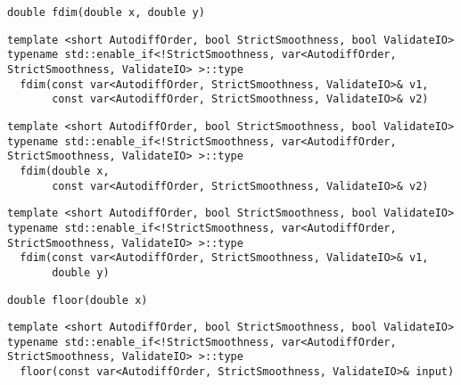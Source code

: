 \begin{tcolorbox}[colback=white,colframe=gray90, coltitle=black,boxrule=3pt,
fonttitle=\bfseries,title= Fdim]

\begin{verbatim}
double fdim(double x, double y)

\end{verbatim}

\begin{verbatim}
template <short AutodiffOrder, bool StrictSmoothness, bool ValidateIO>
typename std::enable_if<!StrictSmoothness, var<AutodiffOrder, StrictSmoothness, ValidateIO> >::type
  fdim(const var<AutodiffOrder, StrictSmoothness, ValidateIO>& v1,
       const var<AutodiffOrder, StrictSmoothness, ValidateIO>& v2)

\end{verbatim}

\begin{verbatim}
template <short AutodiffOrder, bool StrictSmoothness, bool ValidateIO>
typename std::enable_if<!StrictSmoothness, var<AutodiffOrder, StrictSmoothness, ValidateIO> >::type
  fdim(double x,
       const var<AutodiffOrder, StrictSmoothness, ValidateIO>& v2)

\end{verbatim}

\begin{verbatim}
template <short AutodiffOrder, bool StrictSmoothness, bool ValidateIO>
typename std::enable_if<!StrictSmoothness, var<AutodiffOrder, StrictSmoothness, ValidateIO> >::type
  fdim(const var<AutodiffOrder, StrictSmoothness, ValidateIO>& v1,
       double y)

\end{verbatim}

\end{tcolorbox}

\begin{tcolorbox}[colback=white,colframe=gray90, coltitle=black,boxrule=3pt,
fonttitle=\bfseries,title= Floor]

\begin{verbatim}
double floor(double x)

\end{verbatim}

\begin{verbatim}
template <short AutodiffOrder, bool StrictSmoothness, bool ValidateIO>
typename std::enable_if<!StrictSmoothness, var<AutodiffOrder, StrictSmoothness, ValidateIO> >::type
  floor(const var<AutodiffOrder, StrictSmoothness, ValidateIO>& input)

\end{verbatim}

\end{tcolorbox}


